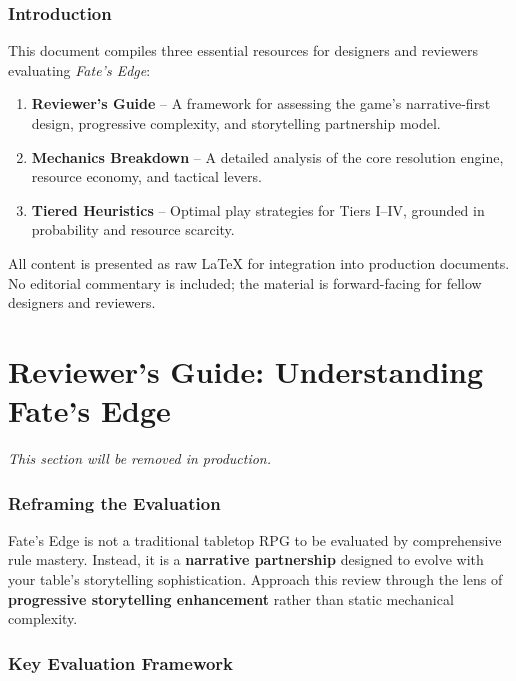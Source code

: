 \documentclass[11pt]{article}
\begin{document}



\tableofcontents
\newpage

\section*{Introduction}
This document compiles three essential resources for designers and reviewers evaluating \textit{Fate's Edge}:
\begin{enumerate}
    \item \textbf{Reviewer's Guide} -- A framework for assessing the game's narrative-first design, progressive complexity, and storytelling partnership model.
    \item \textbf{Mechanics Breakdown} -- A detailed analysis of the core resolution engine, resource economy, and tactical levers.
    \item \textbf{Tiered Heuristics} -- Optimal play strategies for Tiers I--IV, grounded in probability and resource scarcity.
\end{enumerate}

All content is presented as raw LaTeX for integration into production documents. No editorial commentary is included; the material is forward-facing for fellow designers and reviewers.

\newpage

\part{Reviewer's Guide: Understanding Fate's Edge}

\textit{This section will be removed in production.}


\section{Reframing the Evaluation}

Fate's Edge is not a traditional tabletop RPG to be evaluated by comprehensive rule mastery. Instead, it is a \textbf{narrative partnership} designed to evolve with your table's storytelling sophistication. Approach this review through the lens of \textbf{progressive storytelling enhancement} rather than static mechanical complexity.

\section{Key Evaluation Framework}
\end{document}

